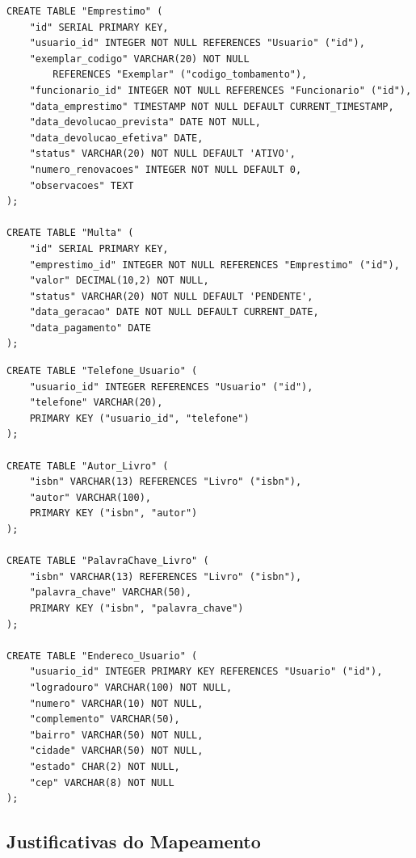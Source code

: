 \documentclass[12pt,a4paper]{article}
\begin{document}
\begin{tcolorbox}[title=3. Empréstimos e Multas,size=small]
\begin{verbatim}
CREATE TABLE "Emprestimo" (
    "id" SERIAL PRIMARY KEY,
    "usuario_id" INTEGER NOT NULL REFERENCES "Usuario" ("id"),
    "exemplar_codigo" VARCHAR(20) NOT NULL
        REFERENCES "Exemplar" ("codigo_tombamento"),
    "funcionario_id" INTEGER NOT NULL REFERENCES "Funcionario" ("id"),
    "data_emprestimo" TIMESTAMP NOT NULL DEFAULT CURRENT_TIMESTAMP,
    "data_devolucao_prevista" DATE NOT NULL,
    "data_devolucao_efetiva" DATE,
    "status" VARCHAR(20) NOT NULL DEFAULT 'ATIVO',
    "numero_renovacoes" INTEGER NOT NULL DEFAULT 0,
    "observacoes" TEXT
);

CREATE TABLE "Multa" (
    "id" SERIAL PRIMARY KEY,
    "emprestimo_id" INTEGER NOT NULL REFERENCES "Emprestimo" ("id"),
    "valor" DECIMAL(10,2) NOT NULL,
    "status" VARCHAR(20) NOT NULL DEFAULT 'PENDENTE',
    "data_geracao" DATE NOT NULL DEFAULT CURRENT_DATE,
    "data_pagamento" DATE
);
\end{verbatim}
\end{tcolorbox}

\begin{tcolorbox}[title=4. Atributos Multivalorados e Compostos,size=small]
\begin{verbatim}
CREATE TABLE "Telefone_Usuario" (
    "usuario_id" INTEGER REFERENCES "Usuario" ("id"),
    "telefone" VARCHAR(20),
    PRIMARY KEY ("usuario_id", "telefone")
);

CREATE TABLE "Autor_Livro" (
    "isbn" VARCHAR(13) REFERENCES "Livro" ("isbn"),
    "autor" VARCHAR(100),
    PRIMARY KEY ("isbn", "autor")
);

CREATE TABLE "PalavraChave_Livro" (
    "isbn" VARCHAR(13) REFERENCES "Livro" ("isbn"),
    "palavra_chave" VARCHAR(50),
    PRIMARY KEY ("isbn", "palavra_chave")
);

CREATE TABLE "Endereco_Usuario" (
    "usuario_id" INTEGER PRIMARY KEY REFERENCES "Usuario" ("id"),
    "logradouro" VARCHAR(100) NOT NULL,
    "numero" VARCHAR(10) NOT NULL,
    "complemento" VARCHAR(50),
    "bairro" VARCHAR(50) NOT NULL,
    "cidade" VARCHAR(50) NOT NULL,
    "estado" CHAR(2) NOT NULL,
    "cep" VARCHAR(8) NOT NULL
);
\end{verbatim}
\end{tcolorbox}

\subsection{Justificativas do Mapeamento}
\end{document}
